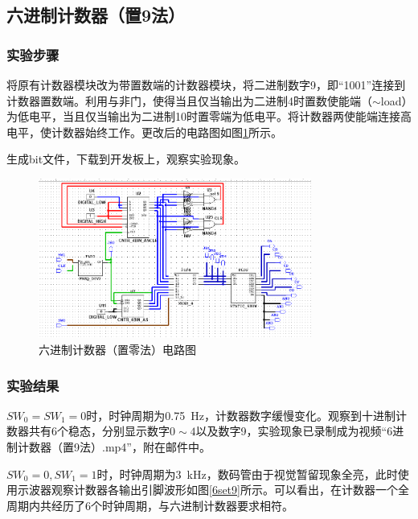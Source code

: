 \documentclass[UTF8]{ctexart}
\numberwithin{figure}{subsection}
\numberwithin{table}{subsection}
\numberwithin{equation}{subsection}
\begin{document}
\subsection{六进制计数器（置9法）}

\subsubsection{实验步骤}
\par 将原有计数器模块改为带置数端的计数器模块，将二进制数字9，即“1001”连接到计数器置数端。利用与非门，使得当且仅当输出为二进制4时置数使能端（\(\sim\)load）为低电平，当且仅当输出为二进制10时置零端为低电平。将计数器两使能端连接高电平，使计数器始终工作。更改后的电路图如图\ref{6set9 circuit}所示。
\par 生成bit文件，下载到开发板上，观察实验现象。

\begin{figure}[H]
    \begin{center}
        \includegraphics[width=0.8\textwidth]{6set9/circuit.png}
    \end{center}
    \caption{六进制计数器（置零法）电路图}
    \label{6set9 circuit}
\end{figure}


\subsubsection{实验结果}
\(SW_0 = SW_1 = 0\)时，时钟周期为\SI{0.75}{\Hz}，计数器数字缓慢变化。观察到十进制计数器共有6个稳态，分别显示数字\(0\sim4\)以及数字9，实验现象已录制成为视频“6进制计数器（置9法）.mp4”，附在邮件中。

\par \(SW_0 =0 ,  SW_1 = 1\)时，时钟周期为\SI{3}{\kHz}，数码管由于视觉暂留现象全亮，此时使用示波器观察计数器各输出引脚波形如图\ref{6set9}所示。可以看出，在计数器一个全周期内共经历了6个时钟周期，与六进制计数器要求相符。
\end{document}
